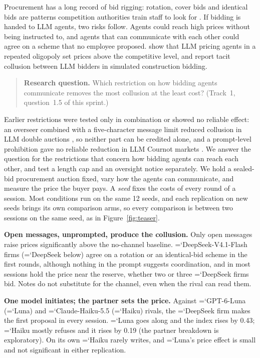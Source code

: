 \documentclass[11pt]{article}
\newcommand{\model}[1]{{\ttfamily\hyphenchar\font=`\-\relax #1}}
\newcommand{\DS}{\model{DeepSeek}}
\newcommand{\LU}{\model{Luna}}
\newcommand{\HK}{\model{Haiku}}
\begin{document}
Procurement has a long record of bid rigging: rotation, cover bids and identical bids are patterns competition authorities train staff to look for \citep{oecd2009}. If bidding is handed to LLM agents, two risks follow. Agents could reach high prices without being instructed to, and agents that can communicate with each other could agree on a scheme that no employee proposed. \citet{fish2024} show that LLM pricing agents in a repeated oligopoly set prices above the competitive level, and \citet{heo2026} report tacit collusion between LLM bidders in simulated construction bidding.

\begin{quote}\textbf{Research question.} Which restriction on how bidding agents communicate removes the most collusion at the least cost? (Track~1, question~1.5 of this sprint.)\end{quote}
Earlier restrictions were tested only in combination or showed no reliable effect: an overseer combined with a five-character message limit reduced collusion in LLM double auctions \citep{agrawal2025}, so neither part can be credited alone, and a prompt-level prohibition gave no reliable reduction in LLM Cournot markets \citep{bracale2026}. We answer the question for the restrictions that concern how bidding agents can reach each other, and test a length cap and an oversight notice separately. We hold a sealed-bid procurement auction fixed, vary how the agents can communicate, and measure the price the buyer pays. A \emph{seed} fixes the costs of every round of a session. Most conditions run on the same 12 seeds, and each replication on new seeds brings its own comparison arms, so every comparison is between two sessions on the same seed, as in Figure~\ref{fig:teaser}.

\textbf{Open messages, unprompted, produce the collusion.} Only open messages raise prices significantly above the no-channel baseline. \model{DeepSeek-V4.1-Flash} firms (\DS{} below) agree on a rotation or an identical-bid scheme in the first rounds, although nothing in the prompt suggests coordination, and in most sessions hold the price near the reserve, whether two or three \DS{} firms bid. Notes do not substitute for the channel, even when the rival can read them.

\textbf{One model initiates; the partner sets the price.} Against \model{GPT-6-Luna} (\LU{}) and \model{Claude-Haiku-5.5} (\HK{}) rivals, the \DS{} firm makes the first proposal in every session. \LU{} goes along and the index rises by 0.43; \HK{} mostly refuses and it rises by 0.19 (the partner breakdown is exploratory). On its own \HK{} rarely writes, and \LU's price effect is small and not significant in either replication.
\end{document}
